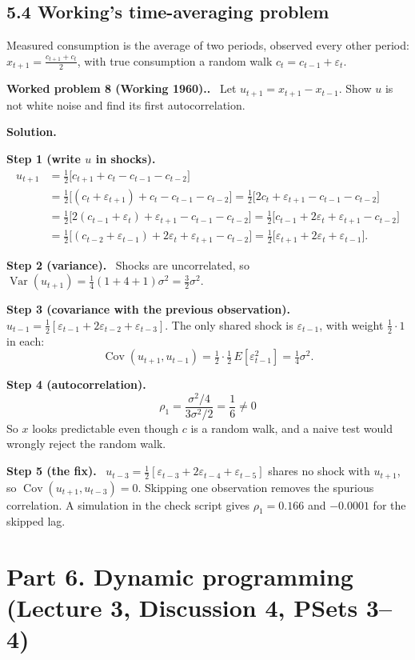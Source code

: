 \documentclass[12pt]{article}
\newcommand{\E}{E}
\DeclareMathOperator{\Var}{Var}
\DeclareMathOperator{\Cov}{Cov}
\newcommand{\st}[1]{\par\smallskip\textbf{Step #1.}\ }
\newcommand{\ans}[1]{\[\boxed{\ #1\ }\]}
\newcommand{\prob}[1]{\par\bigskip\textbf{Worked problem #1.}\ }
\newcommand{\sol}{\par\smallskip\textbf{Solution.}\par}
\begin{document}
\subsection*{5.4 Working's time-averaging problem}
Measured consumption is the average of two periods, observed every other period:
$x_{t+1}=\frac{c_{t+1}+c_t}{2}$, with true consumption a random walk $c_t=c_{t-1}+\varepsilon_t$.

\prob{8 (Working 1960).} Let $u_{t+1}=x_{t+1}-x_{t-1}$. Show $u$ is not white noise and find its first autocorrelation.
\sol
\st{1 (write $u$ in shocks)}
\begin{align*}
u_{t+1}&=\tfrac12\big[c_{t+1}+c_t-c_{t-1}-c_{t-2}\big]\\
&=\tfrac12\big[(c_t+\varepsilon_{t+1})+c_t-c_{t-1}-c_{t-2}\big]=\tfrac12\big[2c_t+\varepsilon_{t+1}-c_{t-1}-c_{t-2}\big]\\
&=\tfrac12\big[2(c_{t-1}+\varepsilon_t)+\varepsilon_{t+1}-c_{t-1}-c_{t-2}\big]=\tfrac12\big[c_{t-1}+2\varepsilon_t+\varepsilon_{t+1}-c_{t-2}\big]\\
&=\tfrac12\big[(c_{t-2}+\varepsilon_{t-1})+2\varepsilon_t+\varepsilon_{t+1}-c_{t-2}\big]=\tfrac12\big[\varepsilon_{t+1}+2\varepsilon_t+\varepsilon_{t-1}\big].
\end{align*}
\st{2 (variance)} Shocks are uncorrelated, so
$\Var(u_{t+1})=\frac14(1+4+1)\sigma^2=\frac32\sigma^2$.
\st{3 (covariance with the previous observation)} $u_{t-1}=\frac12[\varepsilon_{t-1}+2\varepsilon_{t-2}+\varepsilon_{t-3}]$. The only shared shock is $\varepsilon_{t-1}$, with weight $\frac12\cdot1$ in each:
\[
\Cov(u_{t+1},u_{t-1})=\tfrac12\cdot\tfrac12\,\E[\varepsilon_{t-1}^2]=\tfrac14\sigma^2 .
\]
\st{4 (autocorrelation)}
\ans{\rho_1=\frac{\sigma^2/4}{3\sigma^2/2}=\frac16\neq0}
So $x$ looks predictable even though $c$ is a random walk, and a naive test would wrongly reject the random walk.
\st{5 (the fix)} $u_{t-3}=\frac12[\varepsilon_{t-3}+2\varepsilon_{t-4}+\varepsilon_{t-5}]$ shares no shock with $u_{t+1}$, so $\Cov(u_{t+1},u_{t-3})=0$. Skipping one observation removes the spurious correlation. A simulation in the check script gives $\rho_1=0.166$ and $-0.0001$ for the skipped lag.

\section*{Part 6. Dynamic programming (Lecture 3, Discussion 4, PSets 3--4)}
\end{document}
